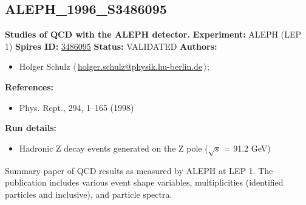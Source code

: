 \subsection[ALEPH\_1996\_S3486095]{ALEPH\_1996\_S3486095\,\cite{Barate:1996fi}}
\textbf{Studies of QCD with the ALEPH detector.}\newline
\textbf{Experiment:} ALEPH (LEP 1) \newline
\textbf{Spires ID:} \href{http://www.slac.stanford.edu/spires/find/hep/www?rawcmd=key+3486095}{3486095}\newline
\textbf{Status:} VALIDATED\newline
\textbf{Authors:}
\begin{itemize}
  \item Holger Schulz $\langle\,$\href{mailto:holger.schulz@physik.hu-berlin.de}{holger.schulz@physik.hu-berlin.de}$\,\rangle$;
\end{itemize}
\textbf{References:}
\begin{itemize}
  \item Phys. Rept., 294, 1--165 (1998)
\end{itemize}
\textbf{Run details:}
\begin{itemize}

  \item Hadronic Z decay events generated on the Z pole (\ensuremath{\sqrt{s}} = 91.2 GeV)\end{itemize}

\noindent Summary paper of QCD results as measured by ALEPH at LEP 1. The publication includes various event shape variables, multiplicities (identified particles and inclusive), and particle spectra.

\clearpage


\clearpage


